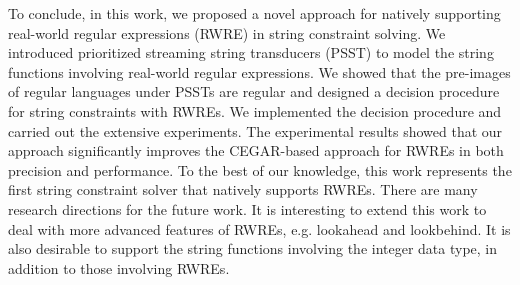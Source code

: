 To conclude, in this work, we proposed a novel approach for natively supporting real-world regular expressions (RWRE) in string constraint solving. We introduced prioritized streaming string transducers (PSST) to  model the string functions involving real-world regular expressions. We showed that the pre-images of regular languages under PSSTs are regular and designed a decision procedure for string constraints with RWREs. We implemented the decision procedure and carried out the extensive experiments. The experimental results showed that our approach significantly improves the CEGAR-based approach for RWREs in both precision and performance. To the best of our knowledge, this work represents the first string constraint solver that natively supports RWREs. There are many research directions for the future work. It is interesting to extend this work to deal with more advanced features of RWREs, e.g. lookahead and lookbehind. It is also desirable to support the string functions involving the integer data type, in addition to those involving RWREs.
